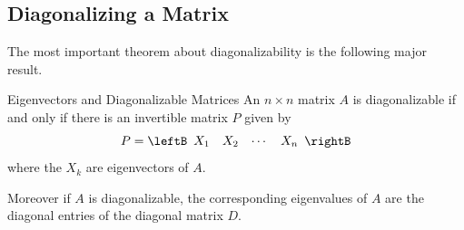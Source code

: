 \subsection{Diagonalizing a Matrix}

The most important theorem about diagonalizability is the following major result.

\begin{theorem}{Eigenvectors and Diagonalizable Matrices}\label{thm:eigenvectorsanddiagonalizable}
An $n\times n$ matrix $A$ is diagonalizable if and only if there is an
invertible matrix $P$ given by 
\begin{equation*}
P=\leftB
\begin{array}{cccc}
X_{1} & X_{2} & \cdots & X_{n}
\end{array}
\rightB
\end{equation*}
where the $X_{k}$ are eigenvectors of $A$. 

Moreover if $A$ is diagonalizable, the corresponding eigenvalues of $A$ are the
diagonal entries of the diagonal matrix $D$.
\end{theorem}

